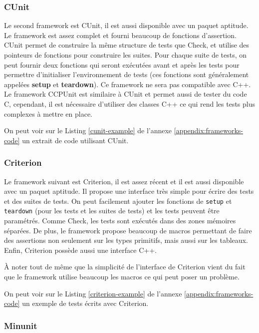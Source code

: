 \documentclass[a4paper]{article}
\begin{document}
\subsubsection*{CUnit}

Le second framework est CUnit, il est aussi disponible avec un paquet aptitude.
Le framework est assez complet et fourni beaucoup de fonctions d'assertion.
CUnit permet de construire la même structure de tests que Check, et utilise des
pointeurs de fonctions pour construire les suites. Pour chaque suite de tests,
on peut fournir deux fonctions qui seront exécutées avant et après les tests
pour permettre d'initialiser l'environnement de tests (ces fonctions sont
généralement appelées \textbf{setup} et \textbf{teardown}). Ce framework ne sera
pas compatible avec C++. Le framework CCPUnit est similaire à CUnit et permet
aussi de tester du code C, cependant, il est nécessaire d'utiliser des classes
C++ ce qui rend les tests plus complexes à mettre en place.

On peut voir sur le Listing \ref{cunit-example} de l'annexe
\ref{appendix:frameworks-code} un extrait de code utilisant CUnit.

\subsubsection*{Criterion}

Le framework suivant est Criterion, il est assez récent et il est aussi
disponible avec un paquet aptitude. Il propose une interface très simple pour
écrire des tests et des suites de tests. On peut facilement ajouter les
fonctions de \verb|setup| et \verb|teardown| (pour les tests et les suites de
tests) et les tests peuvent être paramétrés. Comme Check, les tests sont
exécutés dans des zones mémoires séparées. De plus, le framework propose
beaucoup de macros permettant de faire des assertions non seulement sur les
types primitifs, mais aussi sur les tableaux. Enfin, Criterion possède aussi une
interface C++.

À noter tout de même que la simplicité de l'interface de Criterion vient du fait
que le framework utilise beaucoup les macros ce qui peut poser un problème.

On peut voir sur le Listing \ref{criterion-example} de l'annexe
\ref{appendix:frameworks-code} un exemple de tests écrits avec Criterion.

\subsubsection*{Minunit}
\end{document}

